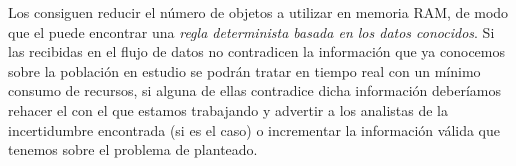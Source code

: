 Los \catalogos consiguen reducir el número de objetos a utilizar en memoria RAM, de modo que el \clasificador puede encontrar una \emph{regla determinista basada en los datos conocidos}. Si las \transacciones recibidas en el flujo de datos no contradicen la información que ya conocemos sobre la población en estudio se podrán tratar en tiempo real con un mínimo consumo de recursos, si alguna de ellas contradice dicha información deberíamos rehacer el \catalogo con el que estamos trabajando y advertir a los analistas de la incertidumbre encontrada (si es el caso) o incrementar la información válida que tenemos sobre el problema de \Clasificacion planteado.
